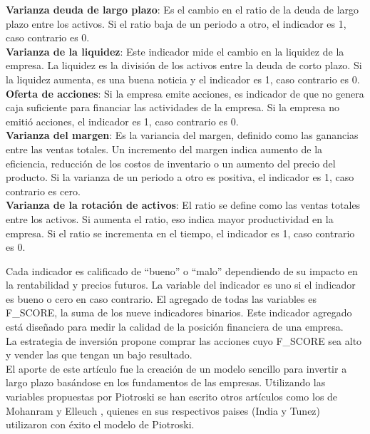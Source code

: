 \textbf{Varianza deuda de largo plazo}: Es el cambio en el ratio de la deuda de largo plazo entre los activos. Si el ratio baja de un periodo a otro, el indicador es 1, caso contrario es 0.\\

\textbf{Varianza de la liquidez}: Este indicador mide el cambio en la liquidez de la empresa. La liquidez es la división de los activos entre la deuda de corto plazo. Si la liquidez aumenta, es una buena noticia y el indicador es 1, caso contrario es 0.\\

\textbf{Oferta de acciones}: Si la empresa emite acciones, es indicador de que no genera caja suficiente para financiar las actividades de la empresa. Si la empresa no emitió acciones, el indicador es 1, caso contrario es 0.\\

\textbf{Varianza del margen}: Es la variancia del margen, definido como las ganancias entre las ventas totales. Un incremento del margen indica aumento de la eficiencia, reducción de los costos de inventario o un aumento del precio del producto. Si la varianza de un periodo a otro es positiva, el indicador es 1, caso contrario es cero. \\

\textbf{Varianza de la rotación de activos}: El ratio se define como las ventas totales entre los activos. Si aumenta el ratio, eso indica mayor productividad en la empresa. Si el ratio se incrementa en el tiempo, el indicador es 1, caso contrario es 0.

Cada indicador es calificado de “bueno” o “malo” dependiendo de su impacto en la rentabilidad y precios futuros. La variable del indicador es uno si el indicador es bueno o cero en caso contrario. El agregado de todas las variables es F\_SCORE, la suma de los nueve indicadores binarios. Este indicador agregado está diseñado para medir la calidad de la posición financiera de una empresa.\\

La estrategia de inversión propone comprar las acciones cuyo F\_SCORE sea alto y vender las que tengan un bajo resultado.\\

El aporte de este art\'iculo fue la creación de un modelo sencillo para invertir a largo plazo basándose en los fundamentos de las empresas. Utilizando las variables propuestas por Piotroski se han escrito otros artículos como los de Mohanram \cite{Mohanram2005} y Elleuch \cite{Elleuch2009}, quienes en sus respectivos paises (India y Tunez) utilizaron con \'exito el modelo de Piotroski.\\

